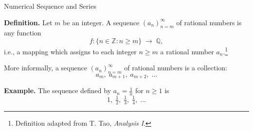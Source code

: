 \documentclass{beamer}
\begin{document}
\begin{frame}{Numerical Sequence and Series}

\textbf{Definition.} Let $m$ be an integer.  
A sequence $(a_n)_{n=m}^{\infty}$ of rational numbers is any function
\[
f: \{ n \in \mathbb{Z} : n \geq m \} \;\to\; \mathbb{Q},
\]
i.e., a mapping which assigns to each integer $n \geq m$ a rational number $a_n$.\footnote{Definition adapted from T. Tao, \emph{Analysis I}.}

\medskip
More informally, a sequence $(a_n)_{n=m}^{\infty}$ of rational numbers is a collection:
\[
a_m, \; a_{m+1}, \; a_{m+2}, \; \dots
\]

\bigskip
\textbf{Example.}  
The sequence defined by $a_n = \tfrac{1}{n}$ for $n \geq 1$ is
\[
1, \; \tfrac{1}{2}, \; \tfrac{1}{3}, \; \tfrac{1}{4}, \; \dots
\]
\]
    
\end{frame}
\end{document}
